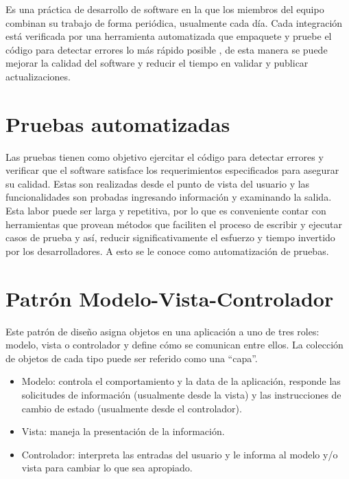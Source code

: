 Es una práctica de desarrollo de software en la que los miembros del equipo combinan su trabajo de forma periódica, usualmente cada día. Cada integración está verificada por una herramienta automatizada que empaquete y pruebe el código para detectar errores lo más rápido posible \cite{Integracion_Continua}, de esta manera se puede mejorar la calidad del software y reducir el tiempo en validar y publicar actualizaciones.

\section{Pruebas automatizadas}

Las pruebas tienen como objetivo ejercitar el código para detectar errores y verificar que el software satisface los requerimientos especificados para asegurar su calidad. Estas son realizadas desde el punto de vista del usuario y las funcionalidades son probadas ingresando información y examinando la salida. \cite{Pruebas_Automatizadas}\\ 

Esta labor puede ser larga y repetitiva, por lo que es conveniente contar con herramientas que provean métodos que faciliten el proceso de escribir y  ejecutar casos de prueba y así, reducir significativamente el esfuerzo y tiempo invertido por los desarrolladores. \cite{Pruebas_Automatizadas} A esto se le conoce como automatización de pruebas. 

\section{Patrón Modelo-Vista-Controlador}

Este patrón de diseño asigna objetos en una aplicación a uno de tres roles: modelo, vista o controlador y define cómo se comunican entre ellos. La colección de objetos de cada tipo puede ser referido como una “capa”.\cite{MVC}

\begin{itemize}
    \item Modelo: controla el comportamiento y la data de la aplicación, responde las solicitudes de información (usualmente desde la vista) y las instrucciones de cambio de estado (usualmente desde el controlador).
    \item Vista: maneja la presentación de la información.
    \item Controlador: interpreta las entradas del usuario y le informa al modelo y/o vista para cambiar lo que sea apropiado.
\end{itemize}
\cite{MVC1}


